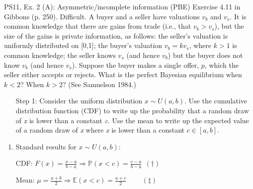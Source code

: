 \begin{frame}{PS11, Ex. 2 (A): Asymmetric/incomplete information (PBE)}
    Exercise 4.11 in Gibbons (p. 250). Difficult. A buyer and a seller have valuations $v_b$ and $v_s$. It is common knowledge that there are gains from trade (i.e., that $v_b > v_s$), but the size of the gains is private information, as follows: the seller’s valuation is uniformly distributed on [0,1]; the buyer’s valuation $v_b = kv_s$, where $k > 1$ is common knowledge; the seller knows $v_s$ (and hence $v_b$) but the buyer does not know $v_b$ (and hence $v_s$). Suppose the buyer makes a single offer, $p$, which the seller either accepts or rejects. What is the perfect Bayesian equilibrium when $k < 2$? When $k > 2$? (See Samuelson 1984.) \vspace{-8pt}
    \begin{multicols}{2}
      \begin{itemize}
        \item[Step 1:] Consider the uniform distribution $x\sim U(a, b)$. Use the cumulative distribution function (CDF) to write up the probability that a random draw of \textit{x} is lower than a constant \textit{c}. Use the mean to write up the expected value of a random draw of \textit{x} where \textit{x} is lower than a constant $c\in[a,b]$.
      \end{itemize}
      \vfill\null\columnbreak
      \begin{enumerate}
        \item Standard results for $x\sim U(a, b):$
        \item[CDF:] $F(x)=\frac{x-a}{b-a}\Rightarrow\mathbb{P}(x<c)=\frac{c-a}{b-a}\ \ (\dagger)$
        \item[Mean:] $\mu=\frac{a+b}{2}\Rightarrow\mathbb{E}(x<c)=\frac{a+c}{2}\quad\quad\ (\ddagger)$
      \end{enumerate}
      \vfill\null
    \end{multicols}
\end{frame}
